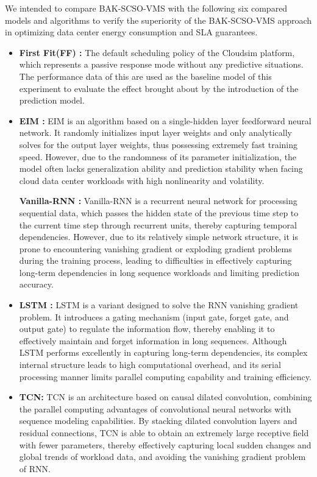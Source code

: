 \documentclass[conference]{{IEEEtran}}
\begin{document}
We intended to compare BAK-SCSO-VMS with the following six compared models and algorithms to verify the superiority of the BAK-SCSO-VMS approach in optimizing data center energy consumption and SLA guarantees.

\begin{itemize}

\item \textbf{First Fit(FF) \cite{wan2010first}:} The default scheduling policy of the Cloudsim platform, which represents a passive response mode without any predictive situations. The performance data of this are used as the baseline model of this experiment to evaluate the effect brought about by the introduction of the prediction model.

\item \textbf{EIM \cite{xu2024advancements}:} EIM is an algorithm based on a single-hidden layer feedforward neural network. It randomly initializes input layer weights and only analytically solves for the output layer weights, thus possessing extremely fast training speed. However, due to the randomness of its parameter initialization, the model often lacks generalization ability and prediction stability when facing cloud data center workloads with high nonlinearity and volatility.

\textbf{Vanilla-RNN \cite{rahhal2020iot}:} Vanilla-RNN is a recurrent neural network for processing sequential data, which passes the hidden state of the previous time step to the current time step through recurrent units, thereby capturing temporal dependencies. However, due to its relatively simple network structure, it is prone to encountering vanishing gradient or exploding gradient problems during the training process, leading to difficulties in effectively capturing long-term dependencies in long sequence workloads and limiting prediction accuracy.

\item \textbf{LSTM \cite{karim2017lstm}:} LSTM is a variant designed to solve the RNN vanishing gradient problem. It introduces a gating mechanism (input gate, forget gate, and output gate) to regulate the information flow, thereby enabling it to effectively maintain and forget information in long sequences. Although LSTM performs excellently in capturing long-term dependencies, its complex internal structure leads to high computational overhead, and its serial processing manner limits parallel computing capability and training efficiency.

\item \textbf{TCN\cite{li2023tcn}:} TCN is an architecture based on causal dilated convolution, combining the parallel computing advantages of convolutional neural networks with sequence modeling capabilities. By stacking dilated convolution layers and residual connections, TCN is able to obtain an extremely large receptive field with fewer parameters, thereby effectively capturing local sudden changes and global trends of workload data, and avoiding the vanishing gradient problem of RNN.


\end{itemize}
\end{document}
